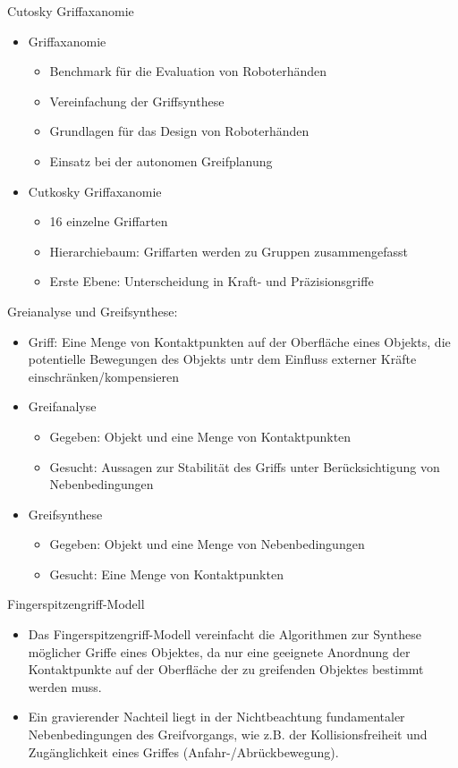 \documentclass[paper=a4, fontsize=11pt]{scrartcl} %
\numberwithin{equation}{section} %
\numberwithin{figure}{section} %
\numberwithin{table}{section} %
\begin{document}
Cutosky Griffaxanomie
\begin{itemize}
\item Griffaxanomie
\begin{itemize}
\item Benchmark für die Evaluation von Roboterhänden
\item Vereinfachung der Griffsynthese
\item Grundlagen für das Design von Roboterhänden
\item Einsatz bei der autonomen Greifplanung
\end{itemize}
\item Cutkosky Griffaxanomie
\begin{itemize}
\item 16 einzelne Griffarten
\item Hierarchiebaum: Griffarten werden zu Gruppen zusammengefasst
\item Erste Ebene: Unterscheidung in Kraft- und Präzisionsgriffe
\end{itemize}
\end{itemize}

Greianalyse und Greifsynthese:
\begin{itemize}
\item Griff: Eine Menge von Kontaktpunkten auf der Oberfläche eines Objekts, die potentielle Bewegungen des Objekts untr dem Einfluss externer Kräfte einschränken/kompensieren
\item Greifanalyse
\begin{itemize}
\item Gegeben: Objekt und eine Menge von Kontaktpunkten
\item Gesucht: Aussagen zur Stabilität des Griffs unter Berücksichtigung von Nebenbedingungen
\end{itemize}
\item Greifsynthese
\begin{itemize}
\item Gegeben: Objekt und eine Menge von Nebenbedingungen
\item Gesucht: Eine Menge von Kontaktpunkten
\end{itemize}
\end{itemize}

Fingerspitzengriff-Modell
\begin{itemize}
\item Das Fingerspitzengriff-Modell vereinfacht die Algorithmen zur Synthese möglicher Griffe eines Objektes, da nur eine geeignete Anordnung der Kontaktpunkte auf der Oberfläche der zu greifenden Objektes bestimmt werden muss.
\item Ein gravierender Nachteil liegt in der Nichtbeachtung fundamentaler Nebenbedingungen des Greifvorgangs, wie z.B. der Kollisionsfreiheit und Zugänglichkeit eines Griffes (Anfahr-/Abrückbewegung).
\end{itemize}
\end{document}
